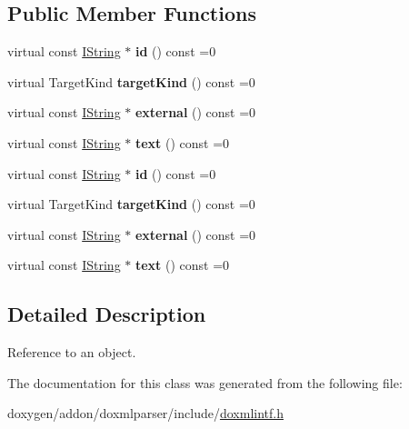 \subsection*{Public Member Functions}
\begin{DoxyCompactItemize}
\item 
\mbox{\label{class_i_l_t___ref_a8851e889db834de8e9fd3e53f6a7d994}} 
virtual const \mbox{\hyperlink{class_i_string}{I\+String}} $\ast$ {\bfseries id} () const =0
\item 
\mbox{\label{class_i_l_t___ref_afd8e51c59921c7b783807c918133ddc4}} 
virtual Target\+Kind {\bfseries target\+Kind} () const =0
\item 
\mbox{\label{class_i_l_t___ref_ad0769e7379a1b05aafdc02646422fac9}} 
virtual const \mbox{\hyperlink{class_i_string}{I\+String}} $\ast$ {\bfseries external} () const =0
\item 
\mbox{\label{class_i_l_t___ref_ab757358a36a769037d8e279f9f1973ea}} 
virtual const \mbox{\hyperlink{class_i_string}{I\+String}} $\ast$ {\bfseries text} () const =0
\item 
\mbox{\label{class_i_l_t___ref_a8851e889db834de8e9fd3e53f6a7d994}} 
virtual const \mbox{\hyperlink{class_i_string}{I\+String}} $\ast$ {\bfseries id} () const =0
\item 
\mbox{\label{class_i_l_t___ref_afd8e51c59921c7b783807c918133ddc4}} 
virtual Target\+Kind {\bfseries target\+Kind} () const =0
\item 
\mbox{\label{class_i_l_t___ref_ad0769e7379a1b05aafdc02646422fac9}} 
virtual const \mbox{\hyperlink{class_i_string}{I\+String}} $\ast$ {\bfseries external} () const =0
\item 
\mbox{\label{class_i_l_t___ref_ab757358a36a769037d8e279f9f1973ea}} 
virtual const \mbox{\hyperlink{class_i_string}{I\+String}} $\ast$ {\bfseries text} () const =0
\end{DoxyCompactItemize}


\subsection{Detailed Description}
Reference to an object. 

The documentation for this class was generated from the following file\+:\begin{DoxyCompactItemize}
\item 
doxygen/addon/doxmlparser/include/\mbox{\hyperlink{include_2doxmlintf_8h}{doxmlintf.\+h}}\end{DoxyCompactItemize}
